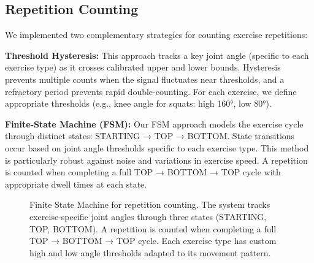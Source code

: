 \documentclass[conference]{IEEEtran}
\begin{document}
\subsection{Repetition Counting}
We implemented two complementary strategies for counting exercise repetitions:

\textbf{Threshold Hysteresis:} This approach tracks a key joint angle (specific to each exercise type) as it crosses calibrated upper and lower bounds. Hysteresis prevents multiple counts when the signal fluctuates near thresholds, and a refractory period prevents rapid double-counting. For each exercise, we define appropriate thresholds (e.g., knee angle for squats: high 160°, low 80°).

\textbf{Finite-State Machine (FSM):} Our FSM approach models the exercise cycle through distinct states: STARTING → TOP → BOTTOM. State transitions occur based on joint angle thresholds specific to each exercise type. This method is particularly robust against noise and variations in exercise speed. A repetition is counted when completing a full TOP → BOTTOM → TOP cycle with appropriate dwell times at each state.

\begin{figure}[t]
  \centering
  \caption{Finite State Machine for repetition counting. The system tracks exercise-specific joint angles through three states (STARTING, TOP, BOTTOM). A repetition is counted when completing a full TOP → BOTTOM → TOP cycle. Each exercise type has custom high and low angle thresholds adapted to its movement pattern.}
  \label{fig:fsm}
\end{figure}
\end{document}
